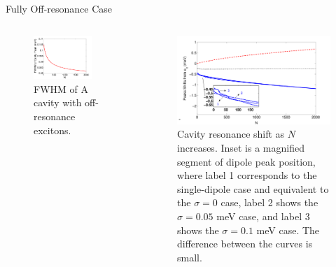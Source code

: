 \documentclass{beamer}
\begin{document}
\begin{frame}{Fully Off-resonance Case}
\begin{columns}
\begin{figure}[htp]%
\centering
\begin{center}
\includegraphics[width=0.8\textwidth]{./Figs/FWHMcav_2000wd0dot5s0dot1}
\end{center}
\caption[off-resonance case.]{\fontsize{8}{-0.2}\selectfont FWHM of A cavity with off-resonance excitons.}
\label{offresonance_FWHM}
\end{figure}

\begin{figure}[htp]%
\centering
\begin{center}
\includegraphics[width=1.09\textwidth]{./Figs/peakshift_wd0dot5_detune_N}
\end{center}
\caption[off-resonance case.]{\fontsize{8}{-0.2}\selectfont Cavity resonance shift as $ N $ increases. Inset is a magnified segment of dipole peak position,
where label 1 corresponds to the single-dipole case and equivalent to the $\sigma=0$ case,
label 2 shows the $\sigma=0.05$ meV case,
and label 3 shows the $\sigma=0.1$ meV case.
The difference between the curves is small.}
\label{offresonance1}
\end{figure}
\end{columns}
\end{frame}
\end{document}
